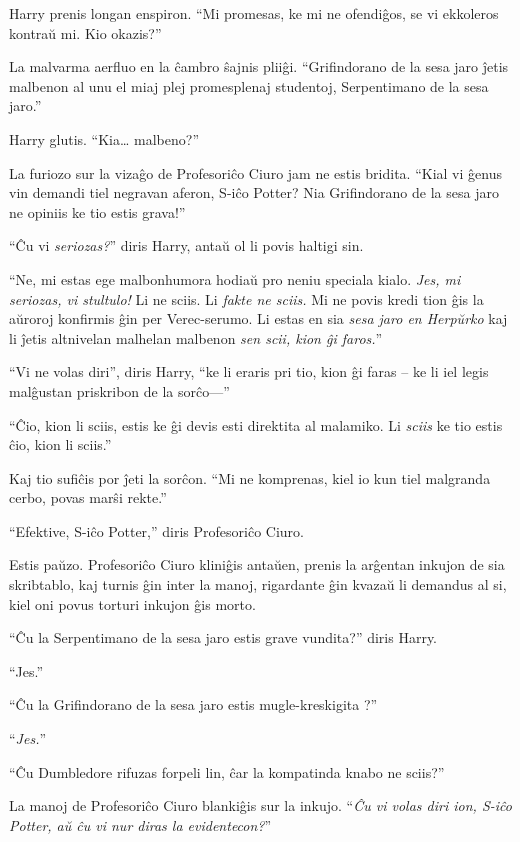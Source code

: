 Harry prenis longan enspiron. ``Mi promesas, ke mi ne ofendiĝos, se vi ekkoleros
kontraŭ mi. Kio okazis?''

La malvarma aerfluo en la ĉambro ŝajnis pliiĝi. ``Grifindorano de la sesa jaro
ĵetis malbenon al unu el miaj plej promesplenaj studentoj, Serpentimano de la
sesa jaro.''

Harry glutis. ``Kia\ldots{} malbeno?''

La furiozo sur la vizaĝo de Profesoriĉo Ciuro jam ne estis bridita. ``Kial vi
ĝenus vin demandi tiel negravan aferon, S-iĉo Potter? Nia Grifindorano de la
sesa jaro ne opiniis ke tio estis grava!''

``Ĉu vi \emph{seriozas?}'' diris Harry, antaŭ ol li povis haltigi sin.

``Ne, mi estas ege malbonhumora hodiaŭ pro neniu speciala kialo. \emph{Jes, mi
seriozas, vi stultulo!} Li ne sciis. Li \emph{fakte ne sciis.} Mi ne povis kredi
tion ĝis la aŭroroj konfirmis ĝin per Verec-serumo. Li estas en sia \emph{sesa
jaro en Herpŭrko} kaj li ĵetis altnivelan malhelan malbenon \emph{sen scii, kion
ĝi faros.}''

``Vi ne volas diri'', diris Harry, ``ke li eraris pri tio, kion ĝi faras -- ke
li iel legis malĝustan priskribon de la sorĉo—''

``Ĉio, kion li sciis, estis ke ĝi devis esti direktita al malamiko. Li
\emph{sciis} ke tio estis ĉio, kion li sciis.''

Kaj tio sufiĉis por ĵeti la sorĉon. ``Mi ne komprenas, kiel io kun tiel
malgranda cerbo, povas marŝi rekte.''

``Efektive, S-iĉo Potter,'' diris Profesoriĉo Ciuro.

Estis paŭzo. Profesoriĉo Ciuro kliniĝis antaŭen, prenis la arĝentan inkujon de
sia skribtablo, kaj turnis ĝin inter la manoj, rigardante ĝin kvazaŭ li demandus
al si, kiel oni povus torturi inkujon ĝis morto.

``Ĉu la Serpentimano de la sesa jaro estis grave vundita?'' diris Harry.

``Jes.''

``Ĉu la Grifindorano de la sesa jaro estis mugle-kreskigita ?''

``\emph{Jes.}''

``Ĉu Dumbledore rifuzas forpeli lin, ĉar la kompatinda knabo ne sciis?''

La manoj de Profesoriĉo Ciuro blankiĝis sur la inkujo. ``\emph{Ĉu vi volas diri
ion, S-iĉo Potter, aŭ ĉu vi nur diras la evidentecon?}''

